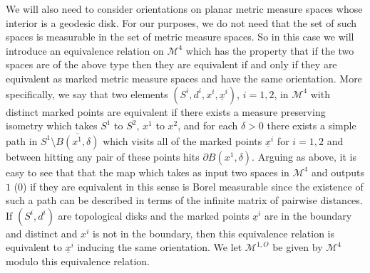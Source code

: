 \documentclass[10pt]{amsart}
\let\mathcal\mathscr
\theoremstyle{plain}
\numberwithin{theorem}{section}
\theoremstyle{definition}
\newcommand\mmspace{{\mathcal M}}
\let\ol\overline
\let\ul\underline
\begin{document}
We will also need to consider orientations on planar metric measure spaces whose interior is a geodesic disk. For our purposes, we do not need that the set of such spaces is measurable in the set of metric measure spaces. So in this case we will introduce an equivalence relation on $\mmspace^4$ which has the property that if the two spaces are of the above type then they are equivalent if and only if they are equivalent as marked metric measure spaces and have the same orientation. More specifically, we say that two elements $(S^i,d^i,x^i,\ul{x}^i)$, $i=1,2$, in $\mmspace^4$ with distinct marked points are equivalent if there exists a measure preserving isometry which takes $S^1$ to $S^2$, $x^1$ to $x^2$, and for each $\delta > 0$ there exists a simple path in $S^1 \setminus \ol{B(x^1,\delta)}$ which visits all of the marked points $\ul{x}^i$ for $i=1,2$ and between hitting any pair of these points hits $\partial B(x^1,\delta)$. Arguing as above, it is easy to see that that the map which takes as input two spaces in $\mmspace^4$ and outputs $1$ (\resp $0$) if they are equivalent in this sense is Borel measurable since the existence of such a path can be described in terms of the infinite matrix of pairwise distances. If $(S^i,d^i)$ are topological disks and the marked points $\ul{x}^i$ are in the boundary and distinct and $x^i$ is not in the boundary, then this equivalence relation is equivalent to $\ul{x}^i$ inducing the same orientation. We let $\mmspace^{1,O}$ be given by $\mmspace^4$ modulo this equivalence relation.
\end{document}
